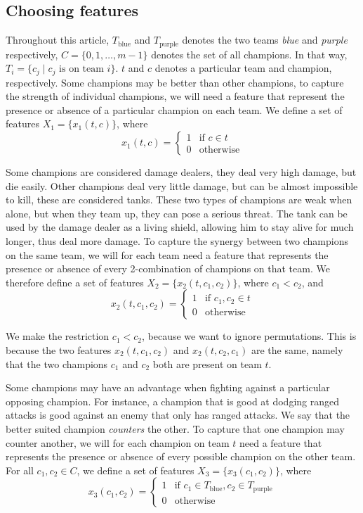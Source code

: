 \subsection{Choosing features}\label{sec:choosingfeatures}
Throughout this article, $T_\text{blue}$ and $T_\text{purple}$ denotes the two teams \emph{blue} and \emph{purple} respectively, $C = \{0, 1, \dots, m-1\}$ denotes the set of all champions. In that way, $T_i = \{ c_j \mid c_j \text{ is on team } i \}$. $t$ and $c$ denotes a particular team and champion, respectively.
Some champions may be better than other champions, to capture the strength of individual champions, we will need a feature that represent the presence or absence of a particular champion on each team.
We define a set of features $X_1 = \{x_1(t, c)\}$, where
\[
x_1(t, c) = 
\begin{cases} 
  1 & \text{if } c \in t \\
  0 & \text{otherwise} 
\end{cases}
\]

Some champions are considered damage dealers, they deal very high damage, but die easily. Other champions deal very little damage, but can be almost impossible to kill, these are considered tanks. These two types of champions are weak when alone, but when they team up, they can pose a serious threat. The tank can be used by the damage dealer as a living shield, allowing him to stay alive for much longer, thus deal more damage.
To capture the synergy between two champions on the same team, we will for each team need a feature that represents the presence or absence of every 2-combination %
of champions on that team. We therefore define a set of features $X_2 = \{x_2(t, c_1, c_2)\}$, where $c_1 < c_2$, and
\[
x_2(t, c_1, c_2) = 
\begin{cases} 
  1 & \text{if } c_1, c_2 \in t\\
  0 & \text{otherwise} 
\end{cases}
\]

We make the restriction $c_1 < c_2$, because we want to ignore permutations. This is because the two features $x_2(t, c_1, c_2)$ and $x_2(t, c_2, c_1)$ are the same, namely that the two champions $c_1$ and $c_2$ both are present on team $t$.

Some champions may have an advantage when fighting against a particular opposing champion.
For instance, a champion that is good at dodging ranged attacks is good against an enemy that only has ranged attacks.
We say that the better suited champion \emph{counters} the other.
To capture that one champion may counter another, we will for each champion on team $t$ need a feature that represents the presence or absence of every possible champion on the other team.
For all $c_1, c_2 \in C$, we define a set of features $X_3= \{x_3(c_1, c_2) \}$, where
\[x_3(c_1, c_2) = 
\begin{cases} 
1 & \text{if } c_1 \in T_\text{blue}, c_2 \in T_\text{purple} \\ 
0 & \text{otherwise} 
\end{cases}\]

